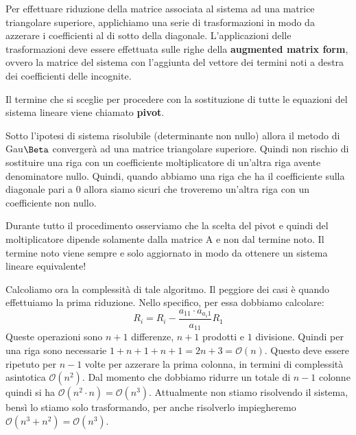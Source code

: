 Per effettuare riduzione della matrice associata al sistema ad una matrice
triangolare superiore, applichiamo una serie di trasformazioni in modo da azzerare
i coefficienti al di sotto della diagonale. L'applicazioni delle trasformazioni
deve essere effettuata sulle righe della \textbf{augmented matrix form}, ovvero
la matrice del sistema con l'aggiunta del vettore dei termini noti a destra dei
coefficienti delle incognite.
\begin{definizione}
    Il termine che si sceglie per procedere con la sostituzione di tutte le
    equazioni del sistema lineare viene chiamato \textbf{pivot}.
\end{definizione}
\begin{nota}
    Sotto l'ipotesi di sistema risolubile (determinante non nullo) allora il metodo
    di Gau$\Beta$ convergerà ad una matrice triangolare superiore. Quindi non
    rischio di sostituire una riga con un coefficiente moltiplicatore di un'altra
    riga avente denominatore nullo. Quindi, quando abbiamo una riga che ha il
    coefficiente sulla diagonale pari a $0$ allora siamo sicuri che troveremo
    un'altra riga con un coefficiente non nullo.
\end{nota}
\begin{osservazione}
    Durante tutto il procedimento osserviamo che la scelta del pivot e quindi
    del moltiplicatore dipende solamente dalla matrice A e non dal termine noto.
    Il termine noto viene sempre e solo aggiornato in modo da ottenere un sistema
    lineare equivalente!
\end{osservazione}

Calcoliamo ora la complessità di tale algoritmo. Il peggiore dei casi è quando
effettuiamo la prima riduzione. Nello specifico, per essa dobbiamo calcolare:
\begin{equation*}
    R_i = R_i - \frac{a_{11}\cdot a_{a_i1}}{a_{11}} R_1
\end{equation*}
Queste operazioni sono $n + 1$ differenze, $n + 1$ prodotti e $1$ divisione. Quindi
per una riga sono necessarie $1 + n + 1 + n + 1 = 2 n + 3 =\mathcal{O}(n)$.
Questo deve essere ripetuto per $n - 1$ volte per azzerare la prima colonna,
in termini di complessità asintotica $\mathcal{O}(n^2)$. Dal momento che dobbiamo
ridurre un totale di $n-1$ colonne quindi si ha $\mathcal{O}(n^2\cdot n) = \mathcal{O}(n^3)$.
Attualmente non stiamo risolvendo il sistema, bensì lo stiamo solo trasformando,
per anche risolverlo impiegheremo  $\mathcal{O}(n^3+ n^2) =\mathcal{O}(n^3)$.

